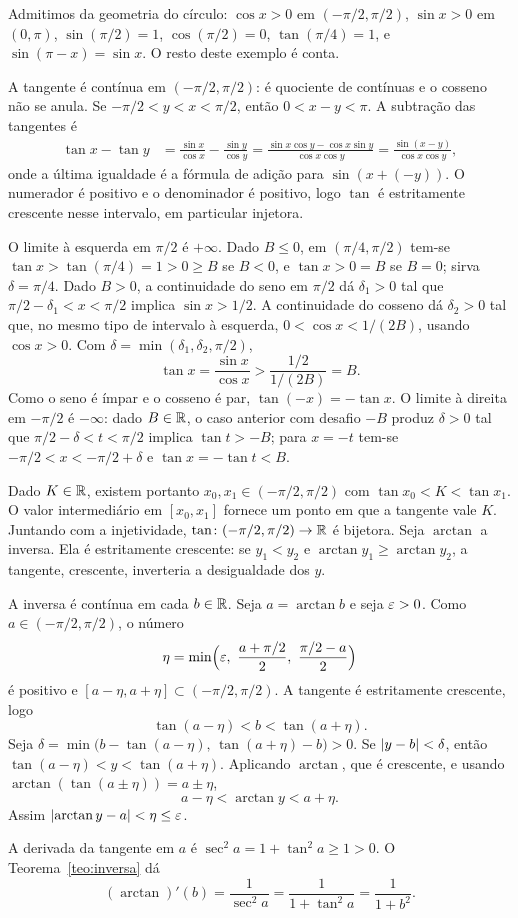 \documentclass[11pt,a4paper]{article}
\begin{document}
\begin{exemplo}
\label{ex:arctan}
Admitimos da geometria do c\'irculo: $\cos x>0$ em $(-\pi/2,\pi/2)$, $\sin x>0$ em $(0,\pi)$, $\sin(\pi/2)=1$, $\cos(\pi/2)=0$, $\tan(\pi/4)=1$, e $\sin(\pi-x)=\sin x$. O resto deste exemplo \'e conta.

A tangente \'e cont\'inua em $(-\pi/2,\pi/2)$: \'e quociente de cont\'inuas e o cosseno n\~ao se anula. Se $-\pi/2<y<x<\pi/2$, ent\~ao $0<x-y<\pi$. A subtra\c{c}\~ao das tangentes \'e
\begin{align*}
\tan x-\tan y
&=\frac{\sin x}{\cos x}-\frac{\sin y}{\cos y}
=\frac{\sin x\cos y-\cos x\sin y}{\cos x\cos y}
=\frac{\sin(x-y)}{\cos x\cos y},
\end{align*}
onde a \'ultima igualdade \'e a f\'ormula de adi\c{c}\~ao para $\sin(x+(-y))$.
O numerador \'e positivo e o denominador \'e positivo, logo $\tan$ \'e estritamente crescente nesse intervalo, em particular injetora.

O limite \`a esquerda em $\pi/2$ \'e $+\infty$. Dado $B\le 0$, em $(\pi/4,\pi/2)$ tem-se $\tan x>\tan(\pi/4)=1>0\ge B$ se $B<0$, e $\tan x>0=B$ se $B=0$; sirva $\delta=\pi/4$. Dado $B>0$, a continuidade do seno em $\pi/2$ d\'a $\delta_1>0$ tal que $\pi/2-\delta_1<x<\pi/2$ implica $\sin x>1/2$. A continuidade do cosseno d\'a $\delta_2>0$ tal que, no mesmo tipo de intervalo \`a esquerda, $0<\cos x<1/(2B)$, usando $\cos x>0$. Com $\delta=\min(\delta_1,\delta_2,\pi/2)$,
\[
\tan x=\frac{\sin x}{\cos x}>\frac{1/2}{1/(2B)}=B.
\]
Como o seno \'e \'impar e o cosseno \'e par, $\tan(-x)=-\tan x$. O limite \`a direita em $-\pi/2$ \'e $-\infty$: dado $B\in\mathbb{R}$, o caso anterior com desafio $-B$ produz $\delta>0$ tal que $\pi/2-\delta<t<\pi/2$ implica $\tan t>-B$; para $x=-t$ tem-se $-\pi/2<x<-\pi/2+\delta$ e $\tan x=-\tan t<B$.

Dado $K\in\mathbb{R}$, existem portanto $x_0,x_1\in(-\pi/2,\pi/2)$ com $\tan x_0<K<\tan x_1$. O valor intermedi\'ario em $[x_0,x_1]$ fornece um ponto em que a tangente vale $K$. Juntando com a injetividade, $\tan\colon(-\pi/2,\pi/2)\to\mathbb{R}$ \'e bijetora. Seja $\arctan$ a inversa. Ela \'e estritamente crescente: se $y_1<y_2$ e $\arctan y_1\ge \arctan y_2$, a tangente, crescente, inverteria a desigualdade dos $y$.

A inversa \'e cont\'inua em cada $b\in\mathbb{R}$. Seja $a=\arctan b$ e seja $\varepsilon>0$. Como $a\in(-\pi/2,\pi/2)$, o n\'umero
\[
\eta=\min\Bigl(\eps,\ \frac{a+\pi/2}{2},\ \frac{\pi/2-a}{2}\Bigr)
\]
\'e positivo e $[a-\eta,a+\eta]\subset(-\pi/2,\pi/2)$. A tangente \'e estritamente crescente, logo
\[
\tan(a-\eta)<b<\tan(a+\eta).
\]
Seja $\delta=\min\bigl(b-\tan(a-\eta),\,\tan(a+\eta)-b\bigr)>0$. Se $\left\lvert y-b \right\rvert<\delta$, ent\~ao $\tan(a-\eta)<y<\tan(a+\eta)$. Aplicando $\arctan$, que \'e crescente, e usando $\arctan(\tan(a\pm\eta))=a\pm\eta$,
\[
a-\eta<\arctan y<a+\eta.
\]
Assim $\left\lvert \arctan y-a \right\rvert<\eta\le\varepsilon$.

A derivada da tangente em $a$ \'e $\sec^2 a=1+\tan^2 a\ge 1>0$. O Teorema~\ref{teo:inversa} d\'a
\[
(\arctan)'(b)=\frac{1}{\sec^2 a}=\frac{1}{1+\tan^2 a}=\frac{1}{1+b^2}.
\]
\end{exemplo}
\end{document}

